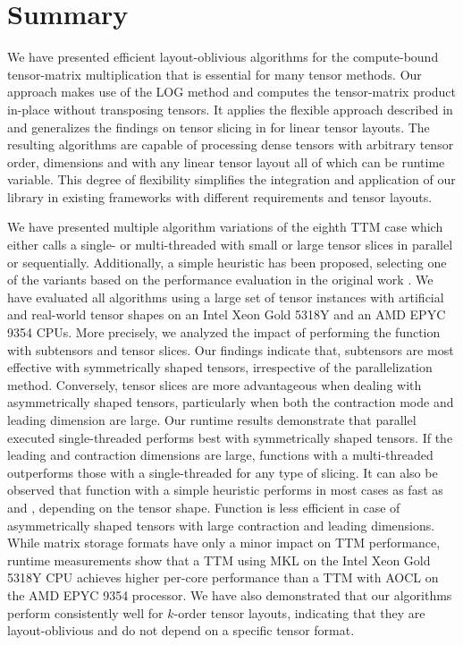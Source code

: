 \section{Summary}
\label{sec:summary}
We have presented efficient layout-oblivious algorithms for the compute-bound tensor-matrix multiplication that is essential for many tensor methods.
Our approach makes use of the LOG method and computes the tensor-matrix product in-place without transposing tensors.
It applies the flexible approach described in \cite{bassoy:2019:ttv} and generalizes the findings on tensor slicing in \cite{li:2015:input} for linear tensor layouts.
The resulting algorithms are capable of processing dense tensors with arbitrary tensor order, dimensions and with any linear tensor layout all of which can be runtime variable.
This degree of flexibility simplifies the integration and application of our library in existing frameworks with different requirements and tensor layouts.

We have presented multiple algorithm variations of the eighth TTM case which either calls a single- or multi-threaded  with small or large tensor slices in parallel or sequentially.
Additionally, a simple heuristic has been proposed, selecting one of the variants based on the performance evaluation in the original work \cite{bassoy:2024:ttm}. 
We have evaluated all algorithms using a large set of tensor instances with artificial and real-world tensor shapes on an Intel Xeon Gold 5318Y and an AMD EPYC 9354 CPUs.
More precisely, we analyzed the impact of performing the  function with subtensors and tensor slices.
Our findings indicate that, subtensors are most effective with symmetrically shaped tensors, irrespective of the parallelization method. 
Conversely, tensor slices are more advantageous when dealing with asymmetrically shaped tensors, particularly when both the contraction mode and leading dimension are large.
Our runtime results demonstrate that parallel executed single-threaded  performs best with symmetrically shaped tensors.
If the leading and contraction dimensions are large, functions with a multi-threaded  outperforms those with a single-threaded  for any type of slicing.
It can also be observed that function  with a simple heuristic performs in most cases as fast as  and , depending on the tensor shape.
Function  is less efficient in case of asymmetrically shaped tensors with large contraction and leading dimensions.
While matrix storage formats have only a minor impact on TTM performance, runtime measurements show that a TTM using MKL on the Intel Xeon Gold 5318Y CPU achieves higher per-core performance than a TTM with AOCL on the AMD EPYC 9354 processor.
We have also demonstrated that our algorithms perform consistently well for $k$-order tensor layouts, indicating that they are layout-oblivious and do not depend on a specific tensor format.

